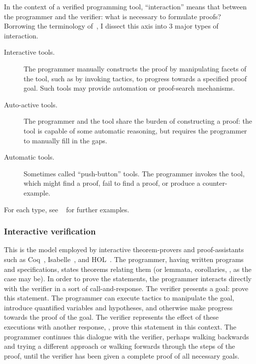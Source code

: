 In the context of a verified programming tool, ``interaction'' means that
between the programmer and the verifier: what is necessary to formulate proofs?
Borrowing the terminology of~\cite[\S 2]{Nelson_2019}, I dissect this axis into
3 major types of interaction.
\begin{description}
    \item[Interactive tools.] The programmer manually constructs the proof by
        manipulating facets of the tool, such as by invoking tactics, to
        progress towards a specified proof goal. Such tools may provide
        automation or proof-search mechanisms.
    \item[Auto-active tools.] The programmer and the tool share the burden of
        constructing a proof: the tool is capable of some automatic reasoning,
        but requires the programmer to manually fill in the gaps.
    \item[Automatic tools.] Sometimes called ``push-button'' tools. The
        programmer invokes the tool, which might find a proof, fail to find a
        proof, or produce a counter-example.
\end{description}

For each type, see \citeauthor{Nelson_2019}~\cite{Nelson_2019} for further
examples.

\subsubsection{Interactive verification}

This is the model employed by interactive theorem-provers and proof-assistants
such as Coq~\cite{Coq}, Isabelle~\cite{Isabelle}, and HOL~\cite{HOL}. The
programmer, having written programs and specifications, states theorems relating
them (or lemmata, corollaries, \etc, as the case may be). In order to prove the
statements, the programmer interacts directly with the verifier in a sort of
call-and-response. The verifier presents a goal: prove this statement. The
programmer can execute tactics to manipulate the goal, introduce quantified
variables and hypotheses, and otherwise make progress towards the proof of the
goal. The verifier represents the effect of these executions with another
response, \eg, prove this statement in this context. The programmer continues
this dialogue with the verifier, perhaps walking backwards and trying a
different approach or walking forwards through the steps of the proof, until the
verifier has been given a complete proof of all necessary goals.

